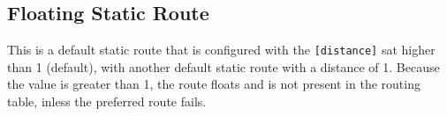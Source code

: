 \subsection{Floating Static Route}
\textrm{This is a default static route that is configured with the \texttt{[distance]} sat higher than 1 (default), with another default static route with a distance of 1. Because the value is greater than 1, the route floats and is not present in the routing table, inless the preferred route fails.}